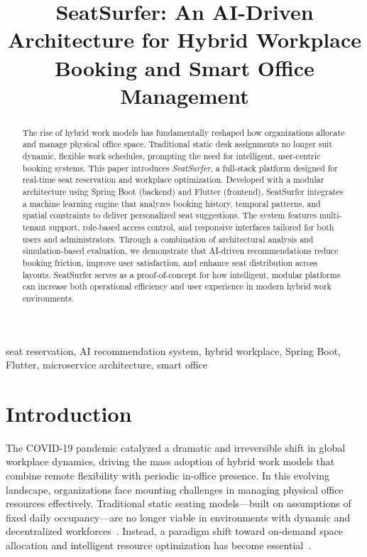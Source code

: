 \documentclass[onecolumn, 12pt]{IEEEtran}
\title{SeatSurfer: An AI-Driven Architecture for Hybrid Workplace Booking and Smart Office Management}
\author{
    \IEEEauthorblockN{Radu-Matei Prodan }
    
    \IEEEauthorblockA{
        \textit{Faculty of Mathematics and Computer Science} \\
        \textit{Babeș-Bolyai University}\\
        Cluj-Napoca, Romania \\
        radu.prodan@stud.ubbcluj.ro
    }
}
\begin{document}
\maketitle

\begin{abstract}
The rise of hybrid work models has fundamentally reshaped how organizations allocate and manage physical office space. Traditional static desk assignments no longer suit dynamic, flexible work schedules, prompting the need for intelligent, user-centric booking systems.
This paper introduces \textit{SeatSurfer}, a full-stack platform designed for real-time seat reservation and workplace optimization. Developed with a modular architecture using Spring Boot (backend) and Flutter (frontend), SeatSurfer integrates a machine learning engine that analyzes booking history, temporal patterns, and spatial constraints to deliver personalized seat suggestions.
The system features multi-tenant support, role-based access control, and responsive interfaces tailored for both users and administrators. Through a combination of architectural analysis and simulation-based evaluation, we demonstrate that AI-driven recommendations reduce booking friction, improve user satisfaction, and enhance seat distribution across layouts.
SeatSurfer serves as a proof-of-concept for how intelligent, modular platforms can increase both operational efficiency and user experience in modern hybrid work environments.
\end{abstract}

\begin{IEEEkeywords}
seat reservation, AI recommendation system, hybrid workplace, Spring Boot, Flutter, microservice architecture, smart office
\end{IEEEkeywords}

\section{Introduction}

The COVID-19 pandemic catalyzed a dramatic and irreversible shift in global workplace dynamics, driving the mass adoption of hybrid work models that combine remote flexibility with periodic in-office presence. In this evolving landscape, organizations face mounting challenges in managing physical office resources effectively. Traditional static seating models—built on assumptions of fixed daily occupancy—are no longer viable in environments with dynamic and decentralized workforces~\cite{baker2021hybrid,nayyar2021smart}. Instead, a paradigm shift toward on-demand space allocation and intelligent resource optimization has become essential~\cite{manogaran2023hybrid}.
\end{document}
